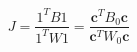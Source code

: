 \documentclass[preview]{standalone}
\begin{document}
\[
    J=\frac{1^TB1}{1^TW1}=\frac{\mathbf{c}^TB_0\mathbf{c}}{\mathbf{c}^TW_0\mathbf{c}}
\]
\end{document}
